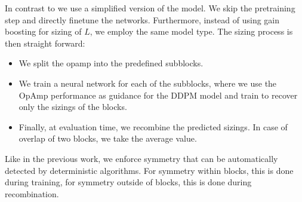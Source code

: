 \documentclass[conference]{IEEEtran}
\begin{document}
	In contrast to \cite{ leibl24inverse} we use a simplified version of the model. We skip the pretraining step and directly finetune the networks. Furthermore, instead of using gain boosting for sizing of $L$, we employ the same model type.
	The sizing process is then straight forward:
	\begin{itemize}
	\item We split the opamp into the predefined subblocks.
	\item We train a neural network for each of the subblocks, where we use the OpAmp performance as guidance for the DDPM model and train to recover only the sizings of the blocks.
	\item Finally, at evaluation time, we recombine the predicted sizings. In case of overlap of two blocks, we take the average value.
	\end{itemize}
	Like in the previous work, we enforce symmetry that can be automatically detected by deterministic algorithms. For symmetry within blocks, this is done during training, for symmetry outside of blocks, this is done during recombination.
			
		
\end{document}
